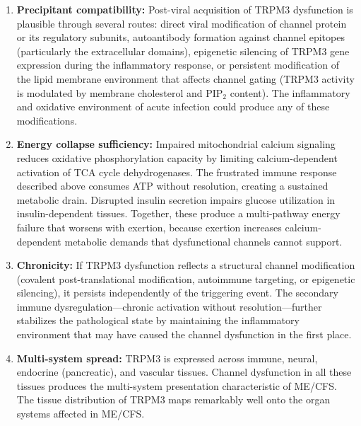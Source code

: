 \begin{enumerate}
    \item \textbf{Precipitant compatibility:} Post-viral acquisition of TRPM3 dysfunction is plausible through several routes: direct viral modification of channel protein or its regulatory subunits, autoantibody formation against channel epitopes (particularly the extracellular domains), epigenetic silencing of TRPM3 gene expression during the inflammatory response, or persistent modification of the lipid membrane environment that affects channel gating (TRPM3 activity is modulated by membrane cholesterol and PIP$_2$ content). The inflammatory and oxidative environment of acute infection could produce any of these modifications.

    \item \textbf{Energy collapse sufficiency:} Impaired mitochondrial calcium signaling reduces oxidative phosphorylation capacity by limiting calcium-dependent activation of TCA cycle dehydrogenases. The frustrated immune response described above consumes ATP without resolution, creating a sustained metabolic drain. Disrupted insulin secretion impairs glucose utilization in insulin-dependent tissues. Together, these produce a multi-pathway energy failure that worsens with exertion, because exertion increases calcium-dependent metabolic demands that dysfunctional channels cannot support.

    \item \textbf{Chronicity:} If TRPM3 dysfunction reflects a structural channel modification (covalent post-translational modification, autoimmune targeting, or epigenetic silencing), it persists independently of the triggering event. The secondary immune dysregulation---chronic activation without resolution---further stabilizes the pathological state by maintaining the inflammatory environment that may have caused the channel dysfunction in the first place.

    \item \textbf{Multi-system spread:} TRPM3 is expressed across immune, neural, endocrine (pancreatic), and vascular tissues. Channel dysfunction in all these tissues produces the multi-system presentation characteristic of ME/CFS. The tissue distribution of TRPM3 maps remarkably well onto the organ systems affected in ME/CFS.
\end{enumerate}

